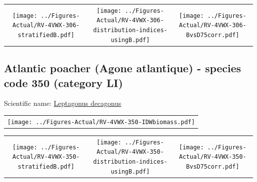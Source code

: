 \documentclass[12pt]{article}\usepackage[]{graphicx}\usepackage[]{color}
\begin{document}
\vspace{1cm}
\begin{minipage}{1.0\textwidth}
 \begin{tabular}{ccc}
\texttt{[image: ../Figures-Actual/RV-4VWX-306-stratifiedB.pdf]} & 
\texttt{[image: ../Figures-Actual/RV-4VWX-306-distribution-indices-usingB.pdf]} & 
\texttt{[image: ../Figures-Actual/RV-4VWX-306-BvsD75corr.pdf]} \\ 
\end{tabular} 
\end{minipage}
\clearpage

\renewcommand\thefigure{\thesubsection\Alph{figure}}

\setcounter{figure}{0}

\hypertarget{sec:350}{%
\subsection{Atlantic poacher (Agone atlantique) - species code 350 (category LI)}\label{sec:350}}

  


Scientific name: \href{http://www.marinespecies.org/aphia.php?p=taxdetails\&id=127191}{Leptagonus decagonus} \newline
\begin{minipage}{1.0\textwidth}
 \begin{tabular}{c}
\texttt{[image: ../Figures-Actual/RV-4VWX-350-IDWbiomass.pdf]} \\ 
\end{tabular} 
\end{minipage}
\newline

\vspace{1cm}
\begin{minipage}{1.0\textwidth}
 \begin{tabular}{ccc}
\texttt{[image: ../Figures-Actual/RV-4VWX-350-stratifiedB.pdf]} & 
\texttt{[image: ../Figures-Actual/RV-4VWX-350-distribution-indices-usingB.pdf]} & 
\texttt{[image: ../Figures-Actual/RV-4VWX-350-BvsD75corr.pdf]} \\ 
\end{tabular} 
\end{minipage}
\clearpage
\end{document}
